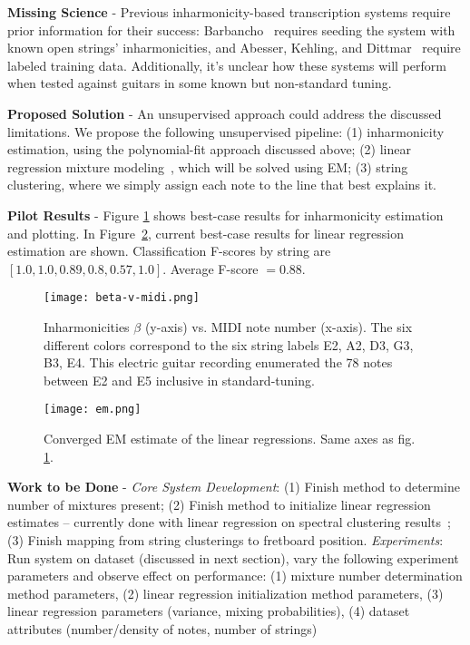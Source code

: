 \documentclass[12pt]{cmuthesis}
\begin{document}
\noindent
\textbf{Missing Science} - Previous inharmonicity-based transcription systems require prior information for their success: Barbancho~\cite{barbanchoi2012} requires seeding the system with known open strings' inharmonicities, and Abesser, Kehling, and Dittmar~\cite{abesser2012, kehling2014, dittmar2013} require labeled training data. Additionally, it's unclear how these systems will perform when tested against guitars in some known but non-standard tuning.

\noindent
\textbf{Proposed Solution} - An unsupervised approach could address the discussed limitations. We propose the following unsupervised pipeline: (1) inharmonicity estimation, using the polynomial-fit approach discussed above; (2) linear regression mixture modeling~\cite{faria2010}, which will be solved using EM; (3) string clustering, where we simply assign each note to the line that best explains it.

\noindent
\textbf{Pilot Results} - Figure \ref{fig:beta} shows best-case results for inharmonicity estimation and plotting. In Figure~\ref{fig:em}, current best-case results for linear regression estimation are shown. Classification F-scores by string are $[1.0, 1.0, 0.89, 0.8, 0.57, 1.0]$. Average F-score $ = 0.88$.

\begin{figure}[h]
\centering
\texttt{[image: beta-v-midi.png]}
\caption{Inharmonicities $\beta$ (y-axis) vs. MIDI note number (x-axis). The six different colors correspond to the six string labels E2, A2, D3, G3, B3, E4. This electric guitar recording enumerated the 78 notes between E2 and E5 inclusive in standard-tuning.}
\label{fig:beta}
\end{figure}

\begin{figure}[h]
\centering
\texttt{[image: em.png]}
\caption{Converged EM estimate of the linear regressions. Same axes as fig. \ref{fig:beta}.}
\label{fig:em}
\end{figure}

\noindent
\textbf{Work to be Done} - \textit{Core System Development}: (1) Finish method to determine number of mixtures present; (2) Finish method to initialize linear regression estimates -- currently done with linear regression on spectral clustering results~\cite{shi2000,ng2001}; (3) Finish mapping from string clusterings to fretboard position. \textit{Experiments}: Run system on dataset (discussed in next section), vary the following experiment parameters and observe effect on performance: (1) mixture number determination method parameters, (2) linear regression initialization method parameters, (3) linear regression parameters (variance, mixing probabilities), (4) dataset attributes (number/density of notes, number of strings)
\end{document}
